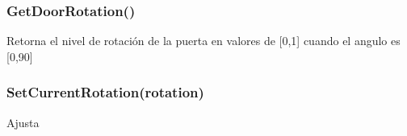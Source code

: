 \subsubsection{GetDoorRotation()}

Retorna el nivel de rotación de la puerta en valores de [0,1] cuando el angulo es [0,90]

\subsubsection{ SetCurrentRotation(rotation)}

Ajusta

\subsubsection{}

\subsubsection{}

\subsubsection{}

\subsubsection{}

\subsubsection{}

\subsubsection{}

\subsubsection{}

\subsubsection{}

\subsubsection{}

\subsubsection{}

\subsubsection{}

